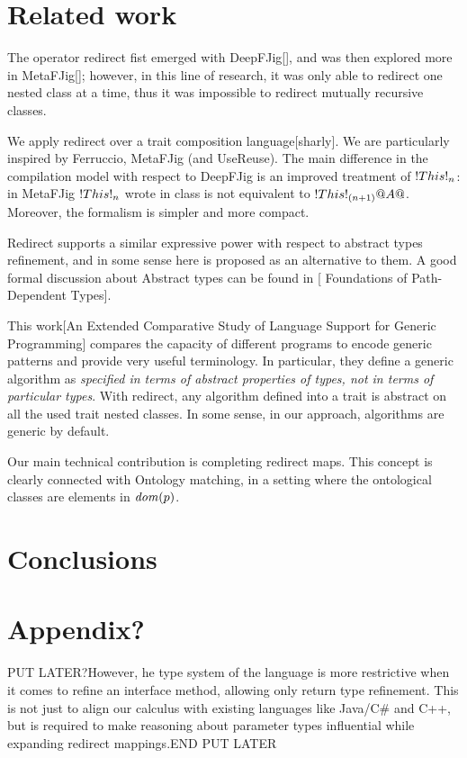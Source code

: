 \section{Related work} 

The operator redirect fist emerged with DeepFJig[],
and was then explored more in MetaFJig[];
however, in this line of research, it was only
able to redirect one nested class at a time, thus it was
impossible to redirect mutually recursive classes.

We apply redirect over a trait composition language[sharly].
We are particularly inspired by Ferruccio, MetaFJig
(and UseReuse).
The main difference in the compilation model with respect to DeepFJig is an improved
treatment of $\This{n}$: in MetaFJig $\This{n}$ wrote in
class \Q@A@ is not equivalent to $\This{(n+1)}{\Q@A@}$.
Moreover, the formalism is simpler and more compact.

Redirect supports a similar expressive power 
with respect to abstract types refinement,
and in some sense here is proposed
as an alternative to them.
A good formal discussion about Abstract types
can be found in [
Foundations of Path-Dependent Types].

This work[An Extended Comparative Study of Language
Support for Generic Programming]
compares the capacity of different programs to encode
generic patterns and provide very useful terminology.
In particular, they define
a generic algorithm as
\emph{specified in terms of abstract properties of types, not in terms of
particular types}.
With redirect, any algorithm defined into a trait
is abstract on all the used trait nested classes. In some sense,
in our approach, algorithms are generic by default.


Our main technical contribution is completing redirect maps.
This concept is clearly connected with
Ontology matching, in a setting where the ontological classes
are elements in $\mathit{dom}(p)$.

\section{Conclusions} 



\section{Appendix?}

PUT LATER?However, he type system of the language is more restrictive when 
it comes to refine an interface method, allowing only return type refinement. This is not just to align our calculus with existing languages like Java/C\# and C++, but is required to make reasoning about parameter types influential while expanding redirect mappings.END PUT LATER


